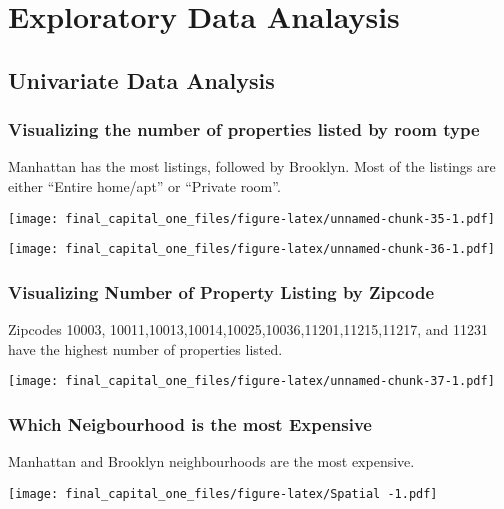 \documentclass[
]{article}
\begin{document}
\hypertarget{exploratory-data-analaysis}{%
\section{Exploratory Data Analaysis}\label{exploratory-data-analaysis}}

\hypertarget{univariate-data-analysis}{%
\subsection{Univariate Data Analysis}\label{univariate-data-analysis}}

\hypertarget{visualizing-the-number-of-properties-listed-by-room-type}{%
\subsubsection{Visualizing the number of properties listed by room
type}\label{visualizing-the-number-of-properties-listed-by-room-type}}

Manhattan has the most listings, followed by Brooklyn. Most of the
listings are either ``Entire home/apt'' or ``Private room''.

\texttt{[image: final\_capital\_one\_files/figure-latex/unnamed-chunk-35-1.pdf]}

\texttt{[image: final\_capital\_one\_files/figure-latex/unnamed-chunk-36-1.pdf]}

\hypertarget{visualizing-number-of-property-listing-by-zipcode}{%
\subsubsection{Visualizing Number of Property Listing by
Zipcode}\label{visualizing-number-of-property-listing-by-zipcode}}

Zipcodes 10003, 10011,10013,10014,10025,10036,11201,11215,11217, and
11231 have the highest number of properties listed.

\texttt{[image: final\_capital\_one\_files/figure-latex/unnamed-chunk-37-1.pdf]}

\hypertarget{which-neigbourhood-is-the-most-expensive}{%
\subsubsection{Which Neigbourhood is the most
Expensive}\label{which-neigbourhood-is-the-most-expensive}}

Manhattan and Brooklyn neighbourhoods are the most expensive.

\texttt{[image: final\_capital\_one\_files/figure-latex/Spatial -1.pdf]}
\end{document}
